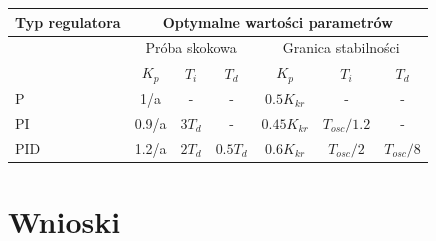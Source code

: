 \documentclass[a4paper,10pt]{article}
\begin{document}
\begin{tabular}{ | l | c | c | c | c | c | c | }
\hline
  Typ regulatora & \multicolumn{6}{|c|}{Optymalne wartości parametrów} \\   \hline
   & \multicolumn{3}{|c|}{Próba skokowa} & \multicolumn{3}{|c|}{Granica stabilności} \\   \hline
   & $K_{p}$ & $T_{i}$ & $T_{d}$ & $K_{p}$ & $T_{i}$ & $T_{d}$\\   \hline
   P & 1/a & - & - & $0.5K_{kr}$ & - & - \\   \hline
   PI & 0.9/a & $3 T_{d}$ & - & $0.45K_{kr}$ & $T_{osc}/1.2$ & - \\   \hline
   PID & 1.2/a & $2T_{d}$ & $0.5T_d$ & $0.6K_{kr}$ & $T_{osc}/2$ & $T_{osc}/8$ \\   \hline
\hline
\end{tabular}


\section{Wnioski}
\end{document}
